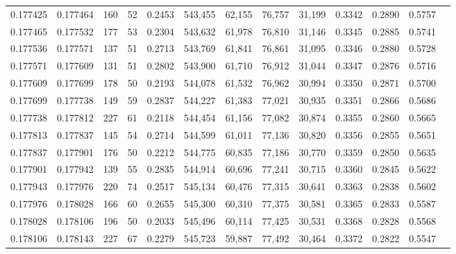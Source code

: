 \begin{tabular}{rrrrrrrrrrrrr}
0.177425 & 0.177464 &   160 &  52 &                                     0.2453 & 543,455 &  62,155 &  76,757 &  31,199 & 0.3342 & 0.2890 & 0.5757 \\
0.177465 & 0.177532 &   177 &  53 &                                     0.2304 & 543,632 &  61,978 &  76,810 &  31,146 & 0.3345 & 0.2885 & 0.5741 \\
0.177536 & 0.177571 &   137 &  51 &                                     0.2713 & 543,769 &  61,841 &  76,861 &  31,095 & 0.3346 & 0.2880 & 0.5728 \\
0.177571 & 0.177609 &   131 &  51 &                                     0.2802 & 543,900 &  61,710 &  76,912 &  31,044 & 0.3347 & 0.2876 & 0.5716 \\
0.177609 & 0.177699 &   178 &  50 &                                     0.2193 & 544,078 &  61,532 &  76,962 &  30,994 & 0.3350 & 0.2871 & 0.5700 \\
0.177699 & 0.177738 &   149 &  59 &                                     0.2837 & 544,227 &  61,383 &  77,021 &  30,935 & 0.3351 & 0.2866 & 0.5686 \\
0.177738 & 0.177812 &   227 &  61 &                                     0.2118 & 544,454 &  61,156 &  77,082 &  30,874 & 0.3355 & 0.2860 & 0.5665 \\
0.177813 & 0.177837 &   145 &  54 &                                     0.2714 & 544,599 &  61,011 &  77,136 &  30,820 & 0.3356 & 0.2855 & 0.5651 \\
0.177837 & 0.177901 &   176 &  50 &                                     0.2212 & 544,775 &  60,835 &  77,186 &  30,770 & 0.3359 & 0.2850 & 0.5635 \\
0.177901 & 0.177942 &   139 &  55 &                                     0.2835 & 544,914 &  60,696 &  77,241 &  30,715 & 0.3360 & 0.2845 & 0.5622 \\
0.177943 & 0.177976 &   220 &  74 &                                     0.2517 & 545,134 &  60,476 &  77,315 &  30,641 & 0.3363 & 0.2838 & 0.5602 \\
0.177976 & 0.178028 &   166 &  60 &                                     0.2655 & 545,300 &  60,310 &  77,375 &  30,581 & 0.3365 & 0.2833 & 0.5587 \\
0.178028 & 0.178106 &   196 &  50 &                                     0.2033 & 545,496 &  60,114 &  77,425 &  30,531 & 0.3368 & 0.2828 & 0.5568 \\
0.178106 & 0.178143 &   227 &  67 &                                     0.2279 & 545,723 &  59,887 &  77,492 &  30,464 & 0.3372 & 0.2822 & 0.5547 \\

\end{tabular}
